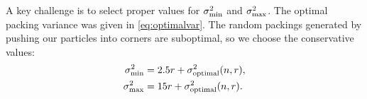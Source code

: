 A key challenge is to select proper values for $\sigma_{\rm{min}}^2$ and $\sigma_{\rm{max}}^2$.  The optimal packing variance was given in \eqref{eq:optimalvar}.
The random packings generated by pushing our particles into corners are suboptimal, so we choose the conservative values: 
\begin{align} \label{eq:sigMaxMin}
 \sigma^2_{\rm{min}} &= 2.5r+ \sigma^2_{\rm{optimal}}(n,r), \nonumber\\
  \sigma^2_{\rm{max}} &= 15r+ \sigma^2_{\rm{optimal}}(n,r).
  \end{align}

















